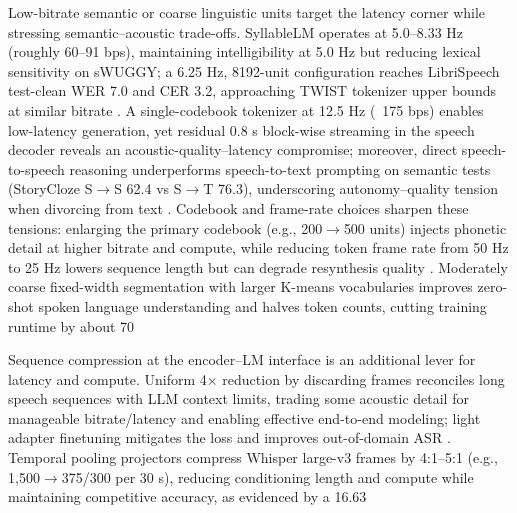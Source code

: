 \documentclass{article}
\begin{document}
Low-bitrate semantic or coarse linguistic units target the latency corner while stressing semantic--acoustic trade-offs. SyllableLM operates at 5.0--8.33 Hz (roughly 60--91 bps), maintaining intelligibility at 5.0 Hz but reducing lexical sensitivity on sWUGGY; a 6.25 Hz, 8192-unit configuration reaches LibriSpeech test-clean WER 7.0 and CER 3.2, approaching TWIST tokenizer upper bounds at similar bitrate \cite{baade2024syllablelmlearningcoarsesemanticunitsspe}. A single-codebook tokenizer at 12.5 Hz (~175 bps) enables low-latency generation, yet residual 0.8 s block-wise streaming in the speech decoder reveals an acoustic-quality--latency compromise; moreover, direct speech-to-speech reasoning underperforms speech-to-text prompting on semantic tests (StoryCloze S$\rightarrow$S 62.4 vs S$\rightarrow$T 76.3), underscoring autonomy--quality tension when divorcing from text \cite{zeng2024glm4voicetowardsintelligenthumanlikeends}. Codebook and frame-rate choices sharpen these tensions: enlarging the primary codebook (e.g., 200$\rightarrow$500 units) injects phonetic detail at higher bitrate and compute, while reducing token frame rate from 50 Hz to 25 Hz lowers sequence length but can degrade resynthesis quality \cite{chang2024dcspinspeakerinvariantspeechtokenizerspo}. Moderately coarse fixed-width segmentation with larger K-means vocabularies improves zero-shot spoken language understanding and halves token counts, cutting training runtime by about 70%



Sequence compression at the encoder--LM interface is an additional lever for latency and compute. Uniform 4$\times$ reduction by discarding frames reconciles long speech sequences with LLM context limits, trading some acoustic detail for manageable bitrate/latency and enabling effective end-to-end modeling; light adapter finetuning mitigates the loss and improves out-of-domain ASR \cite{wang2023slmbridgethingapbetweenspeechtextfoundat}. Temporal pooling projectors compress Whisper large-v3 frames by 4:1--5:1 (e.g., 1,500$\rightarrow$375/300 per 30 s), reducing conditioning length and compute while maintaining competitive accuracy, as evidenced by a 16.63%
\end{document}
